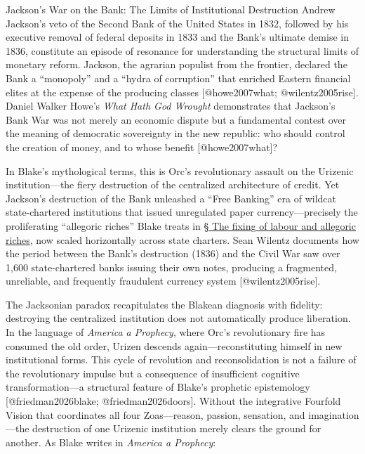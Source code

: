 \documentclass[
  ignorenonframetext,
]{beamer}
\begin{document}
\begin{frame}{Jackson's War on the Bank: The Limits of Institutional
Destruction}
\protect{}\label{jacksons-war-on-the-bank-the-limits-of-institutional-destruction}
Andrew Jackson's veto of the Second Bank of the United States in 1832,
followed by his executive removal of federal deposits in 1833 and the
Bank's ultimate demise in 1836, constitute an episode of resonance for
understanding the structural limits of monetary reform. Jackson, the
agrarian populist from the frontier, declared the Bank a ``monopoly''
and a ``hydra of corruption'' that enriched Eastern financial elites at
the expense of the producing classes {[}@howe2007what;
@wilentz2005rise{]}. Daniel Walker Howe's \emph{What Hath God Wrought}
demonstrates that Jackson's Bank War was not merely an economic dispute
but a fundamental contest over the meaning of democratic sovereignty in
the new republic: who should control the creation of money, and to whose
benefit {[}@howe2007what{]}?

In Blake's mythological terms, this is Orc's revolutionary assault on
the Urizenic institution---the fiery destruction of the centralized
architecture of credit. Yet Jackson's destruction of the Bank unleashed
a ``Free Banking'' era of wildcat state-chartered institutions that
issued unregulated paper currency---precisely the proliferating
``allegoric riches'' Blake treats in \hyperlink{sec-allegoric-riches}{§
The fixing of labour and allegoric riches}, now scaled horizontally
across state charters. Sean Wilentz documents how the period between the
Bank's destruction (1836) and the Civil War saw over 1,600
state-chartered banks issuing their own notes, producing a fragmented,
unreliable, and frequently fraudulent currency system
{[}@wilentz2005rise{]}.

The Jacksonian paradox recapitulates the Blakean diagnosis with
fidelity: destroying the centralized institution does not automatically
produce liberation. In the language of \emph{America a Prophecy}, where
Orc's revolutionary fire has consumed the old order, Urizen descends
again---reconstituting himself in new institutional forms. This cycle of
revolution and reconsolidation is not a failure of the revolutionary
impulse but a consequence of insufficient cognitive transformation---a
structural feature of Blake's prophetic epistemology
{[}@friedman2026blake; @friedman2026doors{]}. Without the integrative
Fourfold Vision that coordinates all four Zoas---reason, passion,
sensation, and imagination---the destruction of one Urizenic institution
merely clears the ground for another. As Blake writes in \emph{America a
Prophecy}:


\end{frame}
\end{document}
